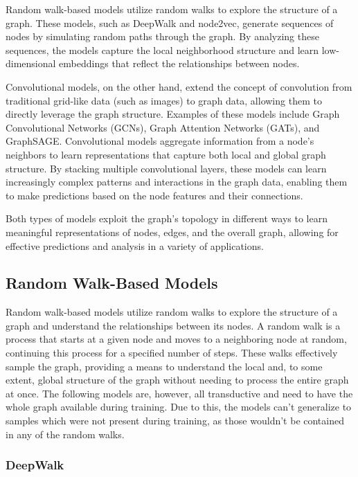 Random walk-based models utilize random walks to explore the structure of a graph. These models, such as DeepWalk and node2vec, generate sequences of nodes by simulating random paths through the graph. By analyzing these sequences, the models capture the local neighborhood structure and learn low-dimensional embeddings that reflect the relationships between nodes.

Convolutional models, on the other hand, extend the concept of convolution from traditional grid-like data (such as images) to graph data, allowing them to directly leverage the graph structure. Examples of these models include Graph Convolutional Networks (GCNs), Graph Attention Networks (GATs), and GraphSAGE\@. Convolutional models aggregate information from a node’s neighbors to learn representations that capture both local and global graph structure. By stacking multiple convolutional layers, these models can learn increasingly complex patterns and interactions in the graph data, enabling them to make predictions based on the node features and their connections.

Both types of models exploit the graph's topology in different ways to learn meaningful representations of nodes, edges, and the overall graph, allowing for effective predictions and analysis in a variety of applications.

\subsection{Random Walk-Based Models}

Random walk-based models utilize random walks to explore the structure of a graph and understand the relationships between its nodes. A random walk is a process that starts at a given node and moves to a neighboring node at random, continuing this process for a specified number of steps. These walks effectively sample the graph, providing a means to understand the local and, to some extent, global structure of the graph without needing to process the entire graph at once. The following models are, however, all transductive and need to have the whole graph available during training. Due to this, the models can't generalize to samples which were not present during training, as those wouldn't be contained in any of the random walks.

\subsubsection{DeepWalk}

